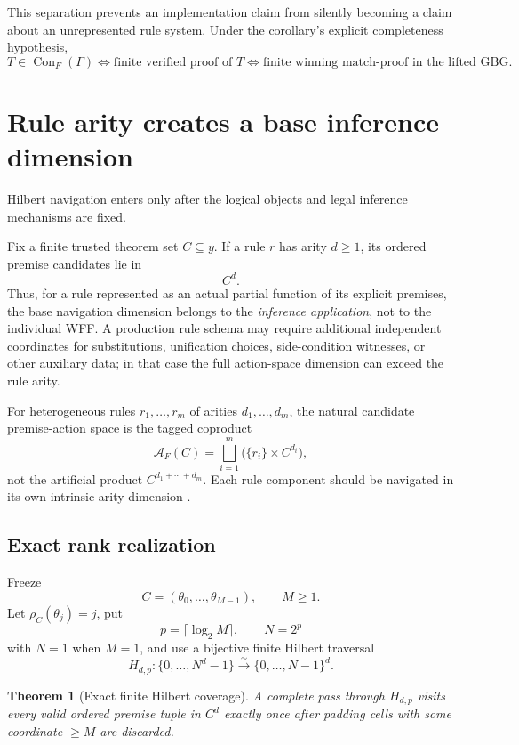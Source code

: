 \documentclass[11pt]{article}
\newtheorem{theorem}{Theorem}[section]
\theoremstyle{definition}
\newcommand{\Con}{\operatorname{Con}}
\begin{document}
This separation prevents an implementation claim from silently becoming a claim about an unrepresented rule system. Under the corollary's explicit completeness hypothesis,
\[
\boxed{
T\in\Con_F(\Gamma)
\Longleftrightarrow
\text{finite verified proof of $T$}
\Longleftrightarrow
\text{finite winning match-proof in the lifted GBG}.
}
\]

\section{Rule arity creates a base inference dimension}

Hilbert navigation enters only after the logical objects and legal inference mechanisms are fixed.

Fix a finite trusted theorem set $C\subseteq y$. If a rule $r$ has arity $d\ge 1$, its ordered premise candidates lie in
\[
C^d.
\]
Thus, for a rule represented as an actual partial function of its explicit premises, the base navigation dimension belongs to the \emph{inference application}, not to the individual WFF. A production rule schema may require additional independent coordinates for substitutions, unification choices, side-condition witnesses, or other auxiliary data; in that case the full action-space dimension can exceed the rule arity.

For heterogeneous rules $r_1,\ldots,r_m$ of arities $d_1,\ldots,d_m$, the natural candidate premise-action space is the tagged coproduct
\[
\mathcal A_F(C)
=
\bigsqcup_{i=1}^m
\bigl(\{r_i\}\times C^{d_i}\bigr),
\]
not the artificial product $C^{d_1+\cdots+d_m}$. Each rule component should be navigated in its own intrinsic arity dimension \cite{TennesonHilbertPartI,TennesonHilbertSearch}.

\subsection{Exact rank realization}

Freeze
\[
C=(\theta_0,\ldots,\theta_{M-1}),
\qquad M\ge 1.
\]
Let $\rho_C(\theta_j)=j$, put
\[
p=\lceil\log_2 M\rceil,
\qquad N=2^p
\]
with $N=1$ when $M=1$, and use a bijective finite Hilbert traversal
\[
H_{d,p}:\{0,\ldots,N^d-1\}\overset{\sim}{\longrightarrow}\{0,\ldots,N-1\}^d.
\]

\begin{theorem}[Exact finite Hilbert coverage]\label{thm:exact-hilbert}
A complete pass through $H_{d,p}$ visits every valid ordered premise tuple in $C^d$ exactly once after padding cells with some coordinate $\ge M$ are discarded.
\end{theorem}
\end{document}
